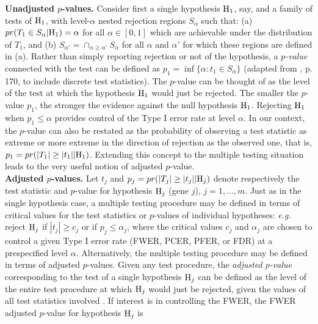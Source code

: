\documentclass[11pt]{article}
\begin{document}
{\bf Unadjusted $p$-values.} Consider first a single hypothesis ${\rm H}_1$, say, and a family of tests of ${\rm H}_1$, with level-$\alpha$ nested rejection regions $S_{\alpha}$ such that: (a) $pr(T_1 \in S_{\alpha}| {\rm H}_1) = \alpha$ for all $\alpha \in [0, 1]$ which are achievable under the distribution of $T_1$, and (b) $S_{\alpha'} = \cap_{\alpha \geq \alpha'} S_{\alpha}$ for all $\alpha$ and $\alpha'$ for which these regions are defined in (a). 
Rather than simply reporting rejection or not of the hypothesis, a {\it $p$-value} connected with the test can be defined as $p_1 = \inf \{ \alpha : t_1 \in S_{\alpha} \}$ (adapted from \cite{TSH}, p. 170, to include discrete test statistics). The $p$-value can be thought of as the level of the test at which the hypothesis ${\rm H}_1$ would just be rejected. The smaller the $p$-value $p_1$, the stronger the evidence against the null hypothesis ${\rm H}_1$. Rejecting ${\rm H}_1$ when $p_1 \leq \alpha$ provides control of the Type I error rate at level $\alpha$. In our context, the $p$-value can also be restated as the probability of observing a test statistic as extreme or more extreme in the direction of rejection as the observed one, that is, $p_1 = pr(|T_1|\geq |t_1| | {\rm H}_1)$.  Extending this concept to the multiple testing situation leads to the very useful notion of adjusted $p$-value.\\

{\bf Adjusted $p$-values.} Let $t_j$ and $p_j = pr(|T_j| \geq |t_j| | {\rm H}_j)$ denote respectively the test statistic and $p$-value for hypothesis ${\rm H}_j$ (gene $j$), $j=1,\ldots,m$. Just as in the single hypothesis case, a multiple testing procedure may be defined in terms of critical values for the test statistics or $p$-values of individual hypotheses: {\it e.g.} reject ${\rm H}_j$ if $|t_j| \geq c_j$ or if $p_j \leq \alpha_j$, where the critical values $c_j$ and $\alpha_j$ are chosen to control a given Type I error rate (FWER, PCER, PFER, or FDR) at a prespecified level $\alpha$. Alternatively, the multiple testing procedure may be defined in terms of adjusted $p$-values. Given any test procedure, the {\it adjusted $p$-value} corresponding to the test of a single hypothesis ${\rm H}_j$ can be defined as the level of the entire test procedure at which ${\rm H}_j$ would just be rejected, given the values of all test statistics involved \citep{Hommel&Bernhard99,Shaffer95,Westfall&Young93,Wright92,Yekutieli&Benjamini99}. If interest is in controlling the FWER, the FWER adjusted $p$-value for hypothesis ${\rm H}_j$ is
\end{document}
